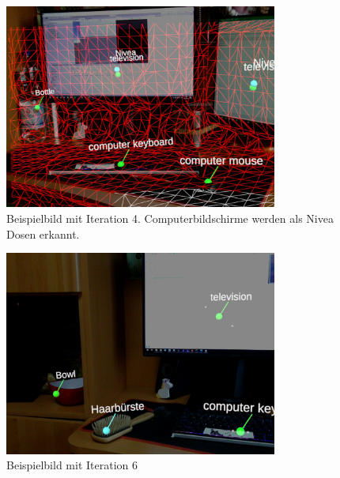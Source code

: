 \begin{figure}[H]
	\centering
	\includegraphics[width=0.8\textwidth]{images/ML_20201005_15.28.37.jpg}
	\caption[Beispielbild mit Iteration 4.]{Beispielbild mit Iteration 4. Computerbildschirme werden als Nivea Dosen erkannt.}
\end{figure}

\begin{figure}[H]
	\centering
	\includegraphics[width=0.8\textwidth]{images/ML_20201014_13.05.56.jpg}
	\caption[Beispielbild mit Iteration 6.]{Beispielbild mit Iteration 6}
\end{figure}

